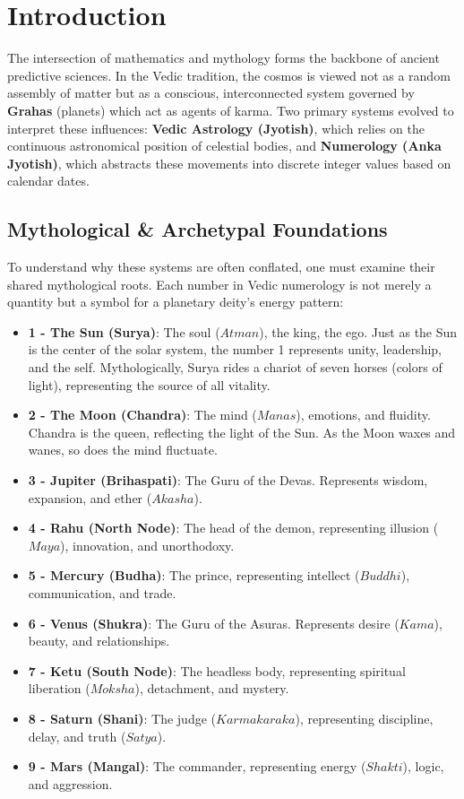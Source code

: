 \documentclass[
  11pt,
  a4paper,
  oneside,
  openany]{article}
\providecommand{\tightlist}{%
  \setlength{\itemsep}{0pt}\setlength{\parskip}{0pt}}\usepackage{longtable,booktabs,array}
\begin{document}
\section{Introduction}\label{introduction}

The intersection of mathematics and mythology forms the backbone of
ancient predictive sciences. In the Vedic tradition, the cosmos is
viewed not as a random assembly of matter but as a conscious,
interconnected system governed by \textbf{Grahas} (planets) which act as
agents of karma. Two primary systems evolved to interpret these
influences: \textbf{Vedic Astrology (Jyotish)}, which relies on the
continuous astronomical position of celestial bodies, and
\textbf{Numerology (Anka Jyotish)}, which abstracts these movements into
discrete integer values based on calendar dates.

\subsection{Mythological \& Archetypal
Foundations}\label{mythological-archetypal-foundations}

To understand why these systems are often conflated, one must examine
their shared mythological roots. Each number in Vedic numerology is not
merely a quantity but a symbol for a planetary deity's energy pattern:

\begin{itemize}
\tightlist
\item
  \textbf{1 - The Sun (Surya)}: The soul (\(Atman\)), the king, the ego.
  Just as the Sun is the center of the solar system, the number 1
  represents unity, leadership, and the self. Mythologically, Surya
  rides a chariot of seven horses (colors of light), representing the
  source of all vitality.
\item
  \textbf{2 - The Moon (Chandra)}: The mind (\(Manas\)), emotions, and
  fluidity. Chandra is the queen, reflecting the light of the Sun. As
  the Moon waxes and wanes, so does the mind fluctuate.
\item
  \textbf{3 - Jupiter (Brihaspati)}: The Guru of the Devas. Represents
  wisdom, expansion, and ether (\(Akasha\)).
\item
  \textbf{4 - Rahu (North Node)}: The head of the demon, representing
  illusion (\(Maya\)), innovation, and unorthodoxy.
\item
  \textbf{5 - Mercury (Budha)}: The prince, representing intellect
  (\(Buddhi\)), communication, and trade.
\item
  \textbf{6 - Venus (Shukra)}: The Guru of the Asuras. Represents desire
  (\(Kama\)), beauty, and relationships.
\item
  \textbf{7 - Ketu (South Node)}: The headless body, representing
  spiritual liberation (\(Moksha\)), detachment, and mystery.
\item
  \textbf{8 - Saturn (Shani)}: The judge (\(Karmakaraka\)), representing
  discipline, delay, and truth (\(Satya\)).
\item
  \textbf{9 - Mars (Mangal)}: The commander, representing energy
  (\(Shakti\)), logic, and aggression.
\end{itemize}
\end{document}
